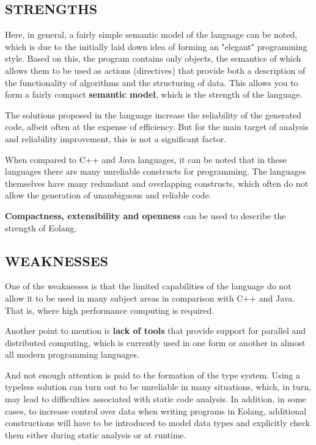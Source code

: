 \documentclass[12pt]{book}
\begin{document}
{{\subsection{STRENGTHS}
Here, in general, a fairly simple semantic model of the language can be noted, which is due to the initially laid down idea of forming an "elegant" programming style. Based on this, the program contains only objects, the semantics of which allows them to be used as actions (directives) that provide both a description of the functionality of algorithms and the structuring of data. This allows you to form a fairly compact \textbf{semantic model}, which is the strength of the language.

The solutions proposed in the language increase the reliability of the generated code, albeit often at the expense of efficiency. But for the main target of analysis and reliability improvement, this is not a significant factor.

When compared to C++ and Java languages, it can be noted that in these languages there are many unreliable constructs for programming. The languages themselves have many redundant and overlapping constructs, which often do not allow the generation of unambiguous and reliable code.

\textbf{Compactness, extensibility and openness } can be used to describe the strength of Eolang.


\subsection{WEAKNESSES}
One of the weaknesses is that the limited capabilities of the language do not allow it to be used in many subject areas in comparison with C++ and Java. That is, where high performance computing is required.

Another point to mention is \textbf{lack of tools} that provide support for parallel and distributed computing, which is currently used in one form or another in almost all modern programming languages.

And not enough attention is paid to the formation of the type system. Using a typeless solution can turn out to be unreliable in many situations, which, in turn, may lead to difficulties associated with static code analysis. In addition, in some cases, to increase control over data when writing programs in Eolang, additional constructions will have to be introduced to model data types and explicitly check them either during static analysis or at runtime.

}}
\end{document}
